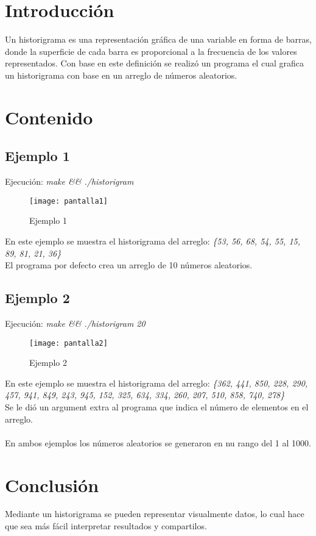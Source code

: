 \documentclass{article}
\begin{document}
\maketitle
\tableofcontents
\section{Introducción}
Un historigrama es una representación gráfica de una variable en forma de barras, donde la superficie de cada barra es proporcional a la frecuencia de los valores representados. Con base en este definición se realizó un programa el cual grafica un historigrama con base en un arreglo de números aleatorios.
\section{Contenido}
\subsection{Ejemplo 1}
Ejecución: \textit{make \&\& ./historigram}
\begin{figure}[h!]
	\centering
	\caption{Ejemplo 1}
	\texttt{[image: pantalla1]}
\end{figure}
\newline
En este ejemplo se muestra el historigrama del arreglo: \textit{\{53, 56, 68, 54, 55, 15, 89, 81, 21, 36\}}\\
El programa por defecto crea un arreglo de 10 números aleatorios.
\subsection{Ejemplo 2}
Ejecución: \textit{make \&\& ./historigram 20}\\
\begin{figure}[h!]
	\centering
	\caption{Ejemplo 2}
	\texttt{[image: pantalla2]}
\end{figure}
\newline
En este ejemplo se muestra el historigrama del arreglo: \textit{\{362, 441, 850, 228, 290, 457, 941, 849, 243, 945, 152, 325, 634, 334, 260, 207, 510, 858, 740, 278\}}\\
Se le dió un argument extra al programa que indica el número de elementos en el arreglo.\\\\
En ambos ejemplos los números aleatorios se generaron en nu rango del 1 al 1000.
\section{Conclusión}
Mediante un historigrama se pueden representar visualmente datos, lo cual hace que sea más fácil interpretar resultados y compartilos.
\end{document}
